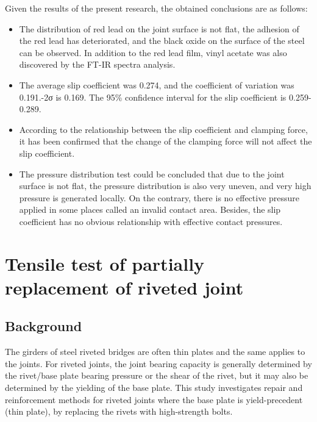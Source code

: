 Given the results of the present research, the obtained conclusions are as follows: 

\begin{itemize}
    \item The distribution of red lead on the joint surface is not flat, the adhesion of the red lead has deteriorated, and the black oxide on the surface of the steel can be observed. In addition to the red lead film, vinyl acetate was also discovered by the FT-IR spectra analysis. 

    \item The average slip coefficient was 0.274, and the coefficient of variation was 0.191.-2σ is 0.169. The 95\% confidence interval for the slip coefficient is 0.259-0.289. 

    \item According to the relationship between the slip coefficient and clamping force, it has been confirmed that the change of the clamping force will not affect the slip coefficient.

    \item The pressure distribution test could be concluded that due to the joint surface is not flat, the pressure distribution is also very uneven, and very high pressure is generated locally. On the contrary, there is no effective pressure applied in some places called an invalid contact area. Besides, the slip coefficient has no obvious relationship with effective contact pressures.
    
\end{itemize}

\section{Tensile test of partially replacement of riveted joint}

\subsection{Background}

The girders of steel riveted bridges are often thin plates and the same applies to the joints. For riveted joints, the joint bearing capacity is generally determined by the rivet/base plate bearing pressure or the shear of the rivet, but it may also be determined by the yielding of the base plate. This study investigates repair and reinforcement methods for riveted joints where the base plate is yield-precedent (thin plate), by replacing the rivets with high-strength bolts.

